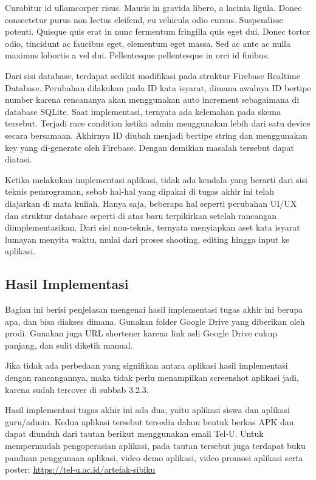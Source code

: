 \documentclass[a4paper,11pt,oneside]{report}
\begin{document}
Curabitur id ullamcorper risus. Mauris in gravida libero, a lacinia ligula.
Donec consectetur purus non lectus eleifend, eu vehicula odio cursus.
Suspendisse potenti. Quisque quis erat in nunc fermentum fringilla quis eget
dui. Donec tortor odio, tincidunt ac faucibus eget, elementum eget massa. Sed ac
ante ac nulla maximus lobortis a vel dui. Pellentesque pellentesque in orci id
finibus.

Dari sisi database, terdapat sedikit modifikasi pada struktur Firebase Realtime
Database. Perubahan dilakukan pada ID kata isyarat, dimana awalnya ID bertipe
number karena rencananya akan menggunakan auto increment sebagaimana di
database SQLite. Saat implementasi, ternyata ada kelemahan pada skema tersebut.
Terjadi race condition ketika admin menggunakan lebih dari satu device secara
bersamaan. Akhirnya ID diubah menjadi bertipe string dan menggunakan key yang
di-generate oleh Firebase. Dengan demikian masalah tersebut dapat diatasi.

Ketika melakukan implementasi aplikasi, tidak ada kendala yang berarti dari sisi
teknis pemrograman, sebab hal-hal yang dipakai di tugas akhir ini telah
diajarkan di mata kuliah. Hanya saja, beberapa hal seperti perubahan UI/UX dan
struktur database seperti di atas baru terpikirkan setelah rancangan
diimplementasikan. Dari sisi non-teknis, ternyata menyiapkan aset kata isyarat
lumayan menyita waktu, mulai dari proses shooting, editing hingga input ke
aplikasi.

\subsection{Hasil Implementasi}
Bagian ini berisi penjelasan mengenai hasil implementasi tugas akhir ini berupa
apa, dan bisa diakses dimana. Gunakan folder Google Drive yang diberikan oleh
prodi. Gunakan juga URL shortener karena link asli Google Drive cukup panjang,
dan sulit diketik manual.

Jika tidak ada perbedaan yang signifikan antara aplikasi hasil implementasi
dengan rancangannya, maka tidak perlu menampilkan screenshot aplikasi jadi,
karena sudah tercover di subbab 3.2.3.

Hasil implementasi tugas akhir ini ada dua, yaitu aplikasi siswa dan aplikasi
guru/admin. Kedua aplikasi tersebut tersedia dalam bentuk berkas APK dan dapat
diunduh dari tautan berikut menggunakan email Tel-U. Untuk mempermudah
pengoperasian aplikasi, pada tautan tersebut juga terdapat buku panduan
penggunaan aplikasi, video demo aplikasi, video promosi aplikasi serta poster:
\url{https://tel-u.ac.id/artefak-sibiku}
\end{document}
